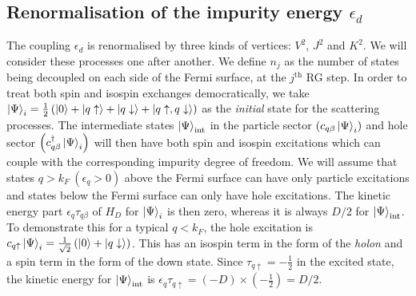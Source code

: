 \subsection{Renormalisation of the impurity energy \(\epsilon_d\)}
The coupling \(\epsilon_d\) is renormalised by three kinds of vertices: \(V^2\), \(J^2\) and \(K^2\). We will consider these processes one after another. We define \(n_j\) as the number of states being decoupled on each side of the Fermi surface, at the \(j^\text{th}\) RG step. In order to treat both spin and isospin exchanges democratically, we take \(\ket{\Psi}_i = \frac{1}{2}\left(\ket{0} + \ket{q\uparrow} + \ket{q\downarrow} + \ket{q\uparrow, q\downarrow}\right) \) as the \textit{initial} state for the scattering processes. The intermediate states \(\ket{\Psi}_\text{int}\) in the particle sector \(\left(c_{q\beta}\ket{\Psi}_i\right)\) and hole sector \(\left(c^\dagger_{q\beta}\ket{\Psi}_i\right)\) will then have both spin and isospin excitations which can couple with the corresponding impurity degree of freedom. We will assume that states  \(q > k_F~\left(\epsilon_q > 0\right) \) above the Fermi surface can have only particle excitations and states below the Fermi surface can only have hole excitations. The kinetic energy part \(\epsilon_q \tau_{q\beta}\) of \(H_D\) for \(\ket{\Psi}_i\) is then zero, whereas it is always \(D/2\) for \(\ket{\Psi}_\text{int}\). To demonstrate this for a typical \(q < k_F\), the hole excitation is \(c_{q \uparrow}\ket{\Psi}_i = \frac{1}{\sqrt 2}\left(\ket{0} + \ket{q \downarrow}\right)\). This has an isospin term in the form of the \textit{holon} and a spin term in the form of the down state. Since \(\tau_{q \uparrow} = -\frac{1}{2}\) in the excited state, the kinetic energy for \(\ket{\Psi}_\text{int}\) is \(\epsilon_q \tau_{q \uparrow} = \left(-D\right)\times\left(-\frac{1}{2}\right) = D/2\).

